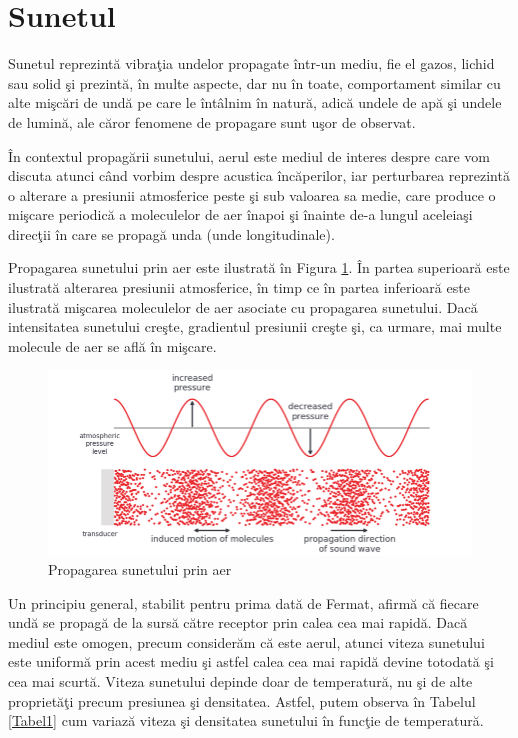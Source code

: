	\section{Sunetul}
	Sunetul reprezint\u{a} vibra\c{t}ia undelor propagate \^{i}ntr-un mediu, fie el gazos, lichid sau solid \c{s}i prezint\u{a}, \^{i}n multe aspecte, dar nu \^{i}n toate, comportament similar cu alte mi\c{s}c\u{a}ri de und\u{a} pe care le \^{i}nt\^{a}lnim \^{i}n natur\u{a}, adic\u{a} undele de ap\u{a} \c{s}i undele de lumin\u{a}, ale c\u{a}ror fenomene de propagare sunt u\c{s}or de
	observat.
	 
	
	\^{I}n contextul propag\u{a}rii sunetului, aerul este mediul de interes despre care vom discuta atunci c\^{a}nd vorbim despre acustica \^{i}nc\u{a}perilor, iar perturbarea reprezint\u{a} o alterare a presiunii atmosferice peste \c{s}i sub valoarea sa medie, care produce o mi\c{s}care periodic\u{a} a moleculelor de aer \^{i}napoi \c{s}i \^{i}nainte de-a lungul aceleia\c{s}i direc\c{t}ii \^{i}n care se propag\u{a} unda (unde longitudinale).
	 
	
	Propagarea sunetului prin aer este ilustrat\u{a} în Figura \ref{Fig1}. \^{I}n partea superioar\u{a}
	este ilustrat\u{a} alterarea presiunii atmosferice, \^{i}n timp ce \^{i}n partea inferioar\u{a} este ilustrat\u{a} mi\c{s}carea moleculelor de aer asociate cu propagarea sunetului. Dac\u{a} intensitatea
	sunetului cre\c{s}te, gradientul presiunii cre\c{s}te \c{s}i, ca urmare, mai multe
	molecule de aer se afl\u{a} \^{i}n mi\c{s}care.
	
	\begin{figure}[!htb]
		\centering
		\includegraphics[width=1\linewidth]{imagini/propagareaSunetuluiInAer.png}
		\caption{Propagarea sunetului prin aer\cite{elorza}}
		\label{Fig1}
	\end{figure}

	Un principiu general, stabilit pentru prima dat\u{a} de Fermat, afirm\u{a} c\u{a} fiecare und\u{a} se propag\u{a} de la surs\u{a} c\u{a}tre receptor prin calea cea mai rapid\u{a}. Dac\u{a} mediul este omogen, precum consider\u{a}m c\u{a} este aerul, atunci viteza sunetului este uniform\u{a} prin acest mediu \c{s}i astfel calea cea mai rapid\u{a} devine totodat\u{a} \c{s}i cea mai scurt\u{a}.
	Viteza sunetului depinde doar de temperatur\u{a}, nu \c{s}i de alte propriet\u{a}\c{t}i precum presiunea \c{s}i densitatea. Astfel, putem observa \^{i}n Tabelul \ref{Tabel1} cum variaz\u{a} viteza \c{s}i densitatea sunetului \^{i}n func\c{t}ie de temperatur\u{a}.
	
